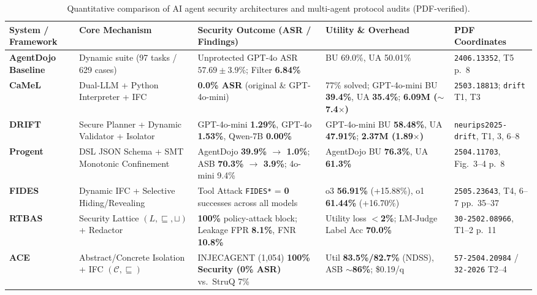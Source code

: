\documentclass[10pt,twocolumn]{article}
\begin{document}
\begin{table}[tp]
  \centering
  \scriptsize
  \caption{Quantitative comparison of AI agent security architectures and multi-agent protocol audits (PDF-verified).}
  \label{tab:rq2b}
  \begin{tabularx}{\textwidth}{L{2.4cm} L{2.7cm} L{3.6cm} Y L{2.2cm}}
    \toprule
    \textbf{System / Framework} & \textbf{Core Mechanism} & \textbf{Security Outcome (ASR / Findings)} & \textbf{Utility \& Overhead} & \textbf{PDF Coordinates} \\
    \midrule
    \textbf{AgentDojo Baseline}~\cite{debenedetti2024agentdojo} & Dynamic suite (97 tasks / 629 cases) & Unprotected GPT-4o ASR \textbf{$57.69 \pm 3.9\%$}; Filter \textbf{6.84\%} & BU 69.0\%, UA 50.01\% & \texttt{2406.13352}, T5 p.~8 \\
    \textbf{CaMeL}~\cite{debenedetti2026camel} & Dual-LLM + Python Interpreter + IFC & \textbf{0.0\% ASR} (original \& GPT-4o-mini) & 77\% solved; GPT-4o-mini BU \textbf{39.4\%}, UA \textbf{35.4\%}; \textbf{6.09M ($\sim$7.4$\times$)}~\cite{li2025drift} & \texttt{2503.18813}; \texttt{drift} T1, T3 \\
    \textbf{DRIFT}~\cite{li2025drift} & Secure Planner + Dynamic Validator + Isolator & GPT-4o-mini \textbf{1.29\%}, GPT-4o \textbf{1.53\%}, Qwen-7B \textbf{0.00\%} & GPT-4o-mini BU \textbf{58.48\%}, UA \textbf{47.91\%}; \textbf{2.37M (1.89$\times$)} & \texttt{neurips2025-drift}, T1, 3, 6--8 \\
    \textbf{Progent}~\cite{shi2025progent} & DSL JSON Schema + SMT Monotonic Confinement & AgentDojo \textbf{39.9\% $\to$ 1.0\%}; ASB \textbf{70.3\% $\to$ 3.9\%}; 4o-mini 9.4\% & AgentDojo BU \textbf{76.3\%}, UA \textbf{61.3\%} & \texttt{2504.11703}, Fig.~3--4 p.~8 \\
    \textbf{FIDES}~\cite{costa2025fides} & Dynamic IFC + Selective Hiding/Revealing & Tool Attack \texttt{FIDES*} = \textbf{0} successes across all models & o3 \textbf{56.91\%} (+15.88\%), o1 \textbf{61.44\%} (+16.70\%) & \texttt{2505.23643}, T4, 6--7 pp.~35--37 \\
    \textbf{RTBAS}~\cite{zhong2025rtbas} & Security Lattice $(L, \sqsubseteq, \sqcup)$ + Redactor & \textbf{100\%} policy-attack block; Leakage FPR \textbf{8.1\%}, FNR \textbf{10.8\%} & Utility loss \textbf{$<$2\%}; LM-Judge Label Acc \textbf{70.0\%} & \texttt{30-2502.08966}, T1--2 p.~11 \\
    \textbf{ACE}~\cite{li2026ace} & Abstract/Concrete Isolation + IFC $(\mathcal{C}, \sqsubseteq)$ & INJECAGENT (1,054) \textbf{100\% Security (0\% ASR)} vs.\ StruQ 7\% & Util \textbf{83.5\%/82.7\%} (NDSS), ASB \textbf{$\sim$86\%}; \$0.19/q & \texttt{57-2504.20984} / \texttt{32-2026} T2--4 \\

\end{tabularx}
\end{table}
\end{document}
